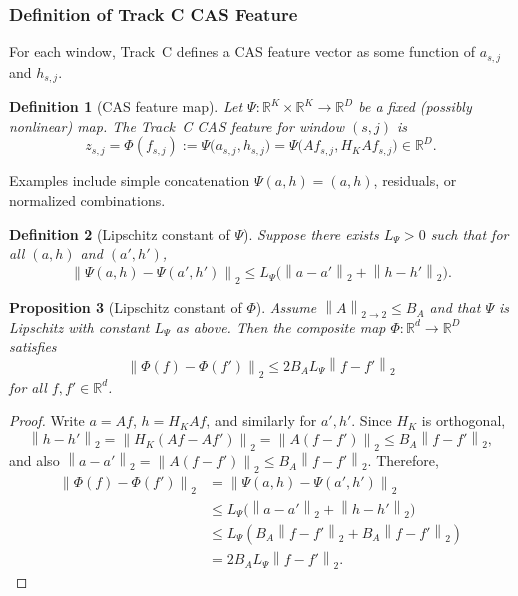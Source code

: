 \documentclass[11pt]{article}
\newtheorem{definition}{Definition}[section]
\newtheorem{proposition}[definition]{Proposition}
\newcommand{\R}{\mathbb{R}}
\newcommand{\norm}[1]{\left\lVert #1 \right\rVert}
\begin{document}
\subsubsection{Definition of Track C CAS Feature}

For each window, Track~C defines a CAS feature vector as some function of \(a_{s,j}\) and \(h_{s,j}\).

\begin{definition}[CAS feature map]
Let \(\Psi : \R^K \times \R^K \to \R^D\) be a fixed (possibly nonlinear) map.
The Track~C CAS feature for window \((s,j)\) is
\[
  z_{s,j} = \Phi(f_{s,j}) := \Psi\bigl(a_{s,j}, h_{s,j}\bigr)
  = \Psi\bigl(A f_{s,j}, H_K A f_{s,j}\bigr) \in \R^D.
\]
\end{definition}

Examples include simple concatenation \(\Psi(a,h) = (a,h)\), residuals, or normalized combinations.

\begin{definition}[Lipschitz constant of \(\Psi\)]
Suppose there exists \(L_\Psi > 0\) such that for all \((a,h)\) and \((a',h')\),
\[
  \norm{\Psi(a,h) - \Psi(a',h')}_2
  \le L_\Psi \bigl( \norm{a-a'}_2 + \norm{h-h'}_2 \bigr).
\]
\end{definition}

\begin{proposition}[Lipschitz constant of \(\Phi\)]
Assume \(\norm{A}_{2\to2} \le B_A\) and that \(\Psi\) is Lipschitz with constant \(L_\Psi\) as above.
Then the composite map \(\Phi : \R^d \to \R^D\) satisfies
\[
  \norm{\Phi(f) - \Phi(f')}_2 \le 2 B_A L_\Psi \norm{f - f'}_2
\]
for all \(f,f' \in \R^d\).
\end{proposition}

\begin{proof}
Write \(a = A f\), \(h = H_K A f\), and similarly for \(a',h'\).
Since \(H_K\) is orthogonal,
\[
  \norm{h - h'}_2 = \norm{H_K(A f - A f')}_2 = \norm{A(f-f')}_2 \le B_A \norm{f-f'}_2,
\]
and also \(\norm{a - a'}_2 = \norm{A(f-f')}_2 \le B_A \norm{f-f'}_2\).
Therefore,
\begin{align*}
  \norm{\Phi(f) - \Phi(f')}_2
  &= \norm{\Psi(a,h) - \Psi(a',h')}_2 \\
  &\le L_\Psi \bigl( \norm{a-a'}_2 + \norm{h-h'}_2 \bigr) \\
  &\le L_\Psi (B_A \norm{f-f'}_2 + B_A \norm{f-f'}_2) \\
  &= 2 B_A L_\Psi \norm{f-f'}_2.
\end{align*}
\end{proof}
\end{document}
